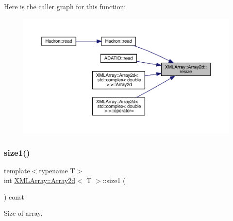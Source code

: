 Here is the caller graph for this function\+:\nopagebreak
\begin{figure}[H]
\begin{center}
\leavevmode
\includegraphics[width=350pt]{dc/ddc/classXMLArray_1_1Array2d_a64001cb2aac062d2179a0285b0279244_icgraph}
\end{center}
\end{figure}
\mbox{\label{classXMLArray_1_1Array2d_a0f5dd764b391ddffd3d89c71bbc6c614}} 
\subsubsection{\texorpdfstring{size1()}{size1()}\hspace{0.1cm}{\footnotesize\ttfamily [1/2]}}
{\footnotesize\ttfamily template$<$typename T$>$ \\
int \mbox{\hyperlink{classXMLArray_1_1Array2d}{X\+M\+L\+Array\+::\+Array2d}}$<$ T $>$\+::size1 (\begin{DoxyParamCaption}{ }\end{DoxyParamCaption}) const\hspace{0.3cm}{\ttfamily [inline]}}



Size of array. 

